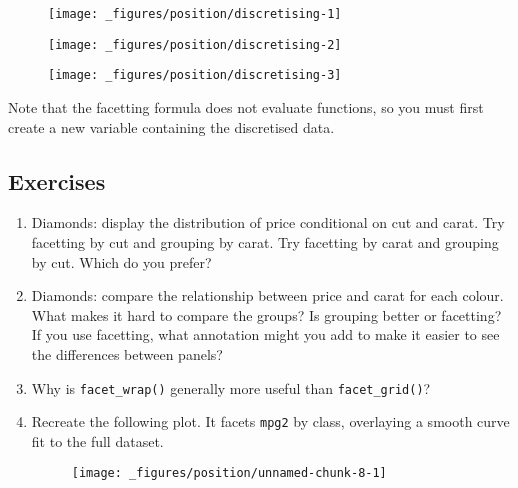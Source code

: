\begin{figure}[H]
  \texttt{[image: \_figures/position/discretising-1]}%
\end{figure}

\begin{Shaded}
\begin{Highlighting}[]
\StringTok{ } \NormalTok{)}
\end{Highlighting}
\end{Shaded}

\begin{figure}[H]
  \texttt{[image: \_figures/position/discretising-2]}%
\end{figure}

\begin{Shaded}
\begin{Highlighting}[]
\StringTok{ } \NormalTok{)}
\end{Highlighting}
\end{Shaded}

\begin{figure}[H]
  \texttt{[image: \_figures/position/discretising-3]}
\end{figure}

Note that the facetting formula does not evaluate functions, so you must
first create a new variable containing the discretised data.

\subsection{Exercises}

\begin{enumerate}
\def\labelenumi{\arabic{enumi}.}
\item
  Diamonds: display the distribution of price conditional on cut and
  carat. Try facetting by cut and grouping by carat. Try facetting by
  carat and grouping by cut. Which do you prefer?
\item
  Diamonds: compare the relationship between price and carat for each
  colour. What makes it hard to compare the groups? Is grouping better
  or facetting? If you use facetting, what annotation might you add to
  make it easier to see the differences between panels?
\item
  Why is \texttt{facet\_wrap()} generally more useful than
  \texttt{facet\_grid()}?
\item
  Recreate the following plot. It facets \texttt{mpg2} by class,
  overlaying a smooth curve fit to the full dataset.

  \begin{figure}[H]
    \centering
    \texttt{[image: \_figures/position/unnamed-chunk-8-1]}
  \end{figure}
\end{enumerate}

